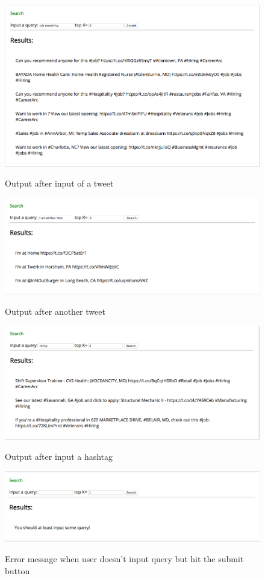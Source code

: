 \documentclass[10pt]{article}
\begin{document}
\begin{figure}[h]
	\caption{Output after input of a tweet}
	\centering
	\includegraphics[scale=0.3]{Screen_Shot_2.png}
	\label{fig2}
\end{figure}

\begin{figure}[h]
	\caption{Output after another tweet}
	\centering
	\includegraphics[scale=0.3]{Screen_Shot_3.png}
	\label{fig3}
\end{figure}

\begin{figure}[h]
	\caption{Output after input a hashtag}
	\centering
	\includegraphics[scale=0.3]{Screen_Shot_4.png}
	\label{fig4}
\end{figure}

\begin{figure}[h]
	\caption{Error message when user doesn't input query but hit the submit button }
	\centering
	\includegraphics[scale=0.3]{Screen_Shot_5.png}
	\label{fig5}
\end{figure}
\end{document}
